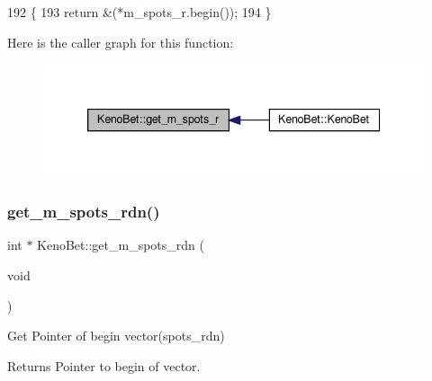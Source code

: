 \begin{DoxyCode}
192 \{
193     \textcolor{keywordflow}{return} &(*m\_spots\_r.begin());
194 \}
\end{DoxyCode}
Here is the caller graph for this function\+:
\nopagebreak
\begin{figure}[H]
\begin{center}
\leavevmode
\includegraphics[width=339pt]{classKenoBet_a1a124437ed672df3e4e7d195d9716540_icgraph}
\end{center}
\end{figure}
\mbox{\label{classKenoBet_a8106aa1f149ba3043a8219453e1af3a1}} 
\subsubsection{\texorpdfstring{get\+\_\+m\+\_\+spots\+\_\+rdn()}{get\_m\_spots\_rdn()}}
{\footnotesize\ttfamily int $\ast$ Keno\+Bet\+::get\+\_\+m\+\_\+spots\+\_\+rdn (\begin{DoxyParamCaption}\item[{void}]{ }\end{DoxyParamCaption})}



Get Pointer of begin vector(spots\+\_\+rdn) 

\begin{DoxyReturn}{Returns}
Pointer to begin of vector. 
\end{DoxyReturn}

